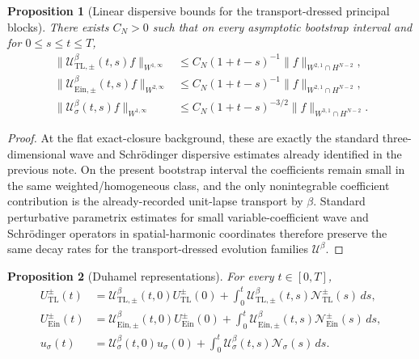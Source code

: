 \documentclass[11pt]{article}
\newtheorem{proposition}{Proposition}
\begin{document}
\begin{proposition}[Linear dispersive bounds for the transport-dressed principal blocks]
\label{prop:lin}
There exists \(C_N>0\) such that on every asymptotic bootstrap interval and for \(0\le s\le t\le T\),
\begin{align}
\|\mathcal U_{\mathrm{TL},\pm}^\beta(t,s)f\|_{W^{1,\infty}}
&\le
C_N(1+t-s)^{-1}\|f\|_{W^{2,1}\cap H^{N-2}},
\label{eq:linTL}
\\
\|\mathcal U_{\mathrm{Ein},\pm}^\beta(t,s)f\|_{W^{2,\infty}}
&\le
C_N(1+t-s)^{-1}\|f\|_{W^{2,1}\cap H^{N-2}},
\label{eq:linEin}
\\
\|\mathcal U_{\sigma}^\beta(t,s)f\|_{W^{1,\infty}}
&\le
C_N(1+t-s)^{-3/2}\|f\|_{W^{3,1}\cap H^{N-2}}.
\label{eq:linSig}
\end{align}
\end{proposition}

\begin{proof}
At the flat exact-closure background, these are exactly the standard three-dimensional wave and Schr\"odinger dispersive estimates already identified in the previous note. On the present bootstrap interval the coefficients remain small in the same weighted/homogeneous class, and the only nonintegrable coefficient contribution is the already-recorded unit-lapse transport by \(\beta\). Standard perturbative parametrix estimates for small variable-coefficient wave and Schr\"odinger operators in spatial-harmonic coordinates therefore preserve the same decay rates for the transport-dressed evolution families \(\mathcal U^\beta\).
\end{proof}

\begin{proposition}[Duhamel representations]
\label{prop:duhamel}
For every \(t\in[0,T]\),
\begin{align}
U_{\mathrm{TL}}^\pm(t)
&=
\mathcal U_{\mathrm{TL},\pm}^\beta(t,0)U_{\mathrm{TL}}^\pm(0)
+ \int_0^t \mathcal U_{\mathrm{TL},\pm}^\beta(t,s)\mathcal N_{\mathrm{TL}}^\pm(s)\,ds,
\label{eq:duhTL}
\\
U_{\mathrm{Ein}}^\pm(t)
&=
\mathcal U_{\mathrm{Ein},\pm}^\beta(t,0)U_{\mathrm{Ein}}^\pm(0)
+ \int_0^t \mathcal U_{\mathrm{Ein},\pm}^\beta(t,s)\mathcal N_{\mathrm{Ein}}^\pm(s)\,ds,
\label{eq:duhEin}
\\
u_\sigma(t)
&=
\mathcal U_{\sigma}^\beta(t,0)u_\sigma(0)
+ \int_0^t \mathcal U_{\sigma}^\beta(t,s)\mathcal N_\sigma(s)\,ds.
\label{eq:duhSig}
\end{align}
\end{proposition}
\end{document}
